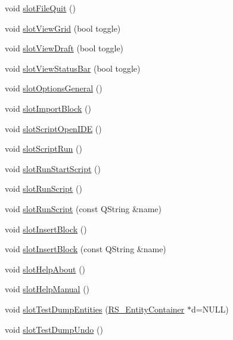 \begin{DoxyCompactItemize}
void \hyperlink{classQC__ApplicationWindow_afa72be8c0ed2fdd9d0d223fea4214fef}{slot\-File\-Quit} ()
\item 
void \hyperlink{classQC__ApplicationWindow_aa38415f4b4b40ff05a70fc65b1363aa5}{slot\-View\-Grid} (bool toggle)
\item 
void \hyperlink{classQC__ApplicationWindow_adc0523a3e38cee0e2c58bead8b75d38a}{slot\-View\-Draft} (bool toggle)
\item 
void \hyperlink{classQC__ApplicationWindow_ac27df745e4791baa42fbf720bc93d958}{slot\-View\-Status\-Bar} (bool toggle)
\item 
void \hyperlink{classQC__ApplicationWindow_a018f1144c11bf71c4f23144d8e3c3dc1}{slot\-Options\-General} ()
\item 
void \hyperlink{classQC__ApplicationWindow_a3754957da74dc1027520ac97bfd9c8f5}{slot\-Import\-Block} ()
\item 
void \hyperlink{classQC__ApplicationWindow_a8f59ad0cd4a4c68e42c643c9b02d93ac}{slot\-Script\-Open\-I\-D\-E} ()
\item 
void \hyperlink{classQC__ApplicationWindow_a8f0ac666c944206a6001bc272bde554f}{slot\-Script\-Run} ()
\item 
void \hyperlink{classQC__ApplicationWindow_a5a6fb2ccdf42bdef7f3306c06fa4725c}{slot\-Run\-Start\-Script} ()
\item 
void \hyperlink{classQC__ApplicationWindow_a1f79e7354304bb5d0acd46f473ec10e6}{slot\-Run\-Script} ()
\item 
void \hyperlink{classQC__ApplicationWindow_aac77d5e3f0ef5e748440ebad25bd7d35}{slot\-Run\-Script} (const Q\-String \&name)
\item 
void \hyperlink{classQC__ApplicationWindow_afb8c0f20f9f24536635bf0a81ce920c6}{slot\-Insert\-Block} ()
\item 
void \hyperlink{classQC__ApplicationWindow_ab464303c074062d7e58d66fb03e576cd}{slot\-Insert\-Block} (const Q\-String \&name)
\item 
void \hyperlink{classQC__ApplicationWindow_a55ac47e68dc844897f5f6fb69a1a06ad}{slot\-Help\-About} ()
\item 
void \hyperlink{classQC__ApplicationWindow_a17eff1b8c1e42e7a5d4fb43043c18677}{slot\-Help\-Manual} ()
\item 
void \hyperlink{classQC__ApplicationWindow_a1fcd4aa7722b15c885032276f8039af7}{slot\-Test\-Dump\-Entities} (\hyperlink{classRS__EntityContainer}{R\-S\-\_\-\-Entity\-Container} $\ast$d=N\-U\-L\-L)
\item 
void \hyperlink{classQC__ApplicationWindow_ae08c46bbd9c1419721d03d45cedec76b}{slot\-Test\-Dump\-Undo} ()

\end{DoxyCompactItemize}

